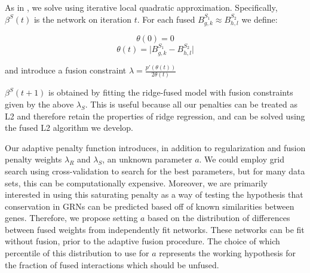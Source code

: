 \documentclass[11pt]{article}
\begin{document}
As in \cite{fan2001variable}, we solve using iterative local quadratic approximation. Specifically, $\beta^S(t)$ is the network on iteration $t$. For each fused $B^{S_1}_{g,k} \approx B^{S_2}_{h,l}$ we define:

\begin{equation} 
\theta(0)=0
\end{equation}
\begin{equation}
\theta(t) = \vert B^{S_1}_{g,k} - B^{S_2}_{h,l} \vert
\end{equation}

and introduce a fusion constraint $\lambda = \frac{p'(\theta(t))}{2\theta(t)} $

$\beta^S(t+1)$ is obtained by fitting the ridge-fused model with fusion constraints given by the above $\lambda_S$. This is useful because all our penalties can be treated as L2 and therefore retain the properties of ridge regression, and can be solved using the fused L2 algorithm we develop.

Our adaptive penalty function introduces, in addition to regularization and fusion penalty weights $\lambda_R$ and $\lambda_S$, an unknown parameter $a$.
We could employ grid search using cross-validation to search for the best parameters, but for many data sets, this can be computationally expensive. 
Moreover, we are primarily interested in using this saturating penalty as a way of testing the hypothesis that conservation in GRNs can be predicted based off of known similarities between genes. 
Therefore, we propose setting $a$ based on the distribution of differences between fused weights from independently fit networks. These networks can be fit without fusion, prior to the adaptive fusion procedure. The choice of which percentile of this distribution to use for $a$ represents the working hypothesis for the fraction of fused interactions which should be unfused.


 
\end{document}
